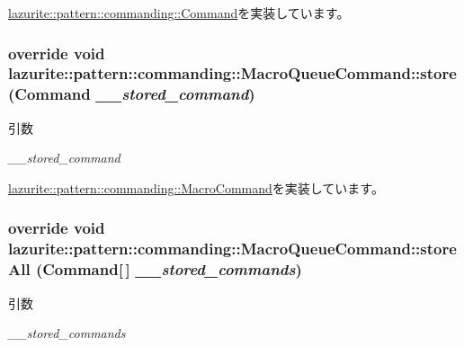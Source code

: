 \hyperlink{classlazurite_1_1pattern_1_1commanding_1_1_command_afd9750cf772a6a65b1a1e11d8313fe03}{lazurite::pattern::commanding::Command}を実装しています。\hypertarget{classlazurite_1_1pattern_1_1commanding_1_1_macro_queue_command_a35d54d52f1bfe9dccbd64f0ce9c69585}{
\subsubsection[{store}]{\setlength{\rightskip}{0pt plus 5cm}override void lazurite::pattern::commanding::MacroQueueCommand::store ({\bf Command} {\em \_\-\_\-stored\_\-command})}}
\label{classlazurite_1_1pattern_1_1commanding_1_1_macro_queue_command_a35d54d52f1bfe9dccbd64f0ce9c69585}

\begin{DoxyParams}{引数}
\item[{\em \_\-\_\-stored\_\-command}]\end{DoxyParams}


\hyperlink{classlazurite_1_1pattern_1_1commanding_1_1_macro_command_a3c48d7d5dc8de76e3164794c9ac2f66f}{lazurite::pattern::commanding::MacroCommand}を実装しています。\hypertarget{classlazurite_1_1pattern_1_1commanding_1_1_macro_queue_command_aa3b1ac137d9b6f16bf2177a4b7804a23}{
\subsubsection[{storeAll}]{\setlength{\rightskip}{0pt plus 5cm}override void lazurite::pattern::commanding::MacroQueueCommand::storeAll ({\bf Command}\mbox{[}$\,$\mbox{]} {\em \_\-\_\-stored\_\-commands})}}
\label{classlazurite_1_1pattern_1_1commanding_1_1_macro_queue_command_aa3b1ac137d9b6f16bf2177a4b7804a23}

\begin{DoxyParams}{引数}
\item[{\em \_\-\_\-stored\_\-commands}]\end{DoxyParams}


